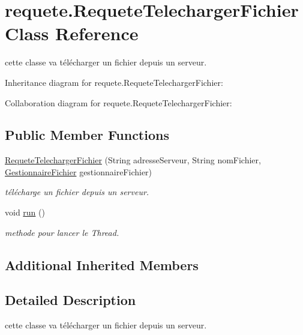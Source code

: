 \hypertarget{classrequete_1_1RequeteTelechargerFichier}{}\section{requete.\+Requete\+Telecharger\+Fichier Class Reference}
\label{classrequete_1_1RequeteTelechargerFichier}


cette classe va télécharger un fichier depuis un serveur.  




Inheritance diagram for requete.\+Requete\+Telecharger\+Fichier\+:


Collaboration diagram for requete.\+Requete\+Telecharger\+Fichier\+:
\subsection*{Public Member Functions}
\begin{DoxyCompactItemize}
\item 
\hyperlink{classrequete_1_1RequeteTelechargerFichier_ad2f914dd2883d44935c00df622f8c60a}{Requete\+Telecharger\+Fichier} (String adresse\+Serveur, String nom\+Fichier, \hyperlink{classcommon_1_1GestionnaireFichier}{Gestionnaire\+Fichier} gestionnaire\+Fichier)
\begin{DoxyCompactList}\small\item\em télécharge un fichier depuis un serveur. \end{DoxyCompactList}\item 
\mbox{\label{classrequete_1_1RequeteTelechargerFichier_a46bf87e436bf43a7695f7f7d264f5e2c}} 
void \hyperlink{classrequete_1_1RequeteTelechargerFichier_a46bf87e436bf43a7695f7f7d264f5e2c}{run} ()
\begin{DoxyCompactList}\small\item\em methode pour lancer le Thread. \end{DoxyCompactList}\end{DoxyCompactItemize}
\subsection*{Additional Inherited Members}


\subsection{Detailed Description}
cette classe va télécharger un fichier depuis un serveur. 


